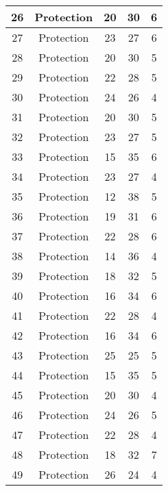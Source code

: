 \documentclass[results.tex]{subfiles}
\begin{document}
\begin{center}
\begin{tabular}{| c || c | c | c | c |}
    \hline
    26 & Protection & 20 & 30 & 6 \\ 
    \hline
    27 & Protection & 23 & 27 & 6 \\ 
    \hline
    28 & Protection & 20 & 30 & 5 \\ 
    \hline
    29 & Protection & 22 & 28 & 5 \\ 
    \hline
    30 & Protection & 24 & 26 & 4 \\ 
    \hline
    31 & Protection & 20 & 30 & 5 \\ 
    \hline
    32 & Protection & 23 & 27 & 5 \\ 
    \hline
    33 & Protection & 15 & 35 & 6 \\ 
    \hline
    34 & Protection & 23 & 27 & 4 \\ 
    \hline
    35 & Protection & 12 & 38 & 5 \\ 
    \hline
    36 & Protection & 19 & 31 & 6 \\ 
    \hline
    37 & Protection & 22 & 28 & 6 \\ 
    \hline
    38 & Protection & 14 & 36 & 4 \\ 
    \hline
    39 & Protection & 18 & 32 & 5 \\ 
    \hline
    40 & Protection & 16 & 34 & 6 \\ 
    \hline
    41 & Protection & 22 & 28 & 4 \\ 
    \hline
    42 & Protection & 16 & 34 & 6 \\ 
    \hline
    43 & Protection & 25 & 25 & 5 \\ 
    \hline
    44 & Protection & 15 & 35 & 5 \\ 
    \hline
    45 & Protection & 20 & 30 & 4 \\ 
    \hline
    46 & Protection & 24 & 26 & 5 \\ 
    \hline
    47 & Protection & 22 & 28 & 4 \\ 
    \hline
    48 & Protection & 18 & 32 & 7 \\ 
    \hline
    49 & Protection & 26 & 24 & 4 \\ 
    \hline   \end{tabular}
\end{center}
\end{document}
